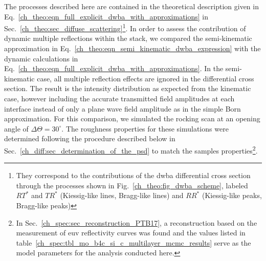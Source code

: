 The processes described here are contained in the theoretical description given in Eq.~\eqref{ch_theo:eqn_full_explicit_dwba_with_approximations} in Sec.~\ref{ch_theo:sec_diffuse_scattering}\footnote{They correspond to the contributions of the \gls{dwba} differential cross section through the processes shown in Fig.~\ref{ch_theo:fig_dwba_scheme}, labeled $R T^*$ and $T R^*$ (Kiessig-like lines, Bragg-like lines) and $R R^*$ (Kiessig-like peaks, Bragg-like peaks)}. In order to assess the contribution of dynamic multiple reflections within the stack, we compared the semi-kinematic approximation in Eq.~\eqref{ch_theo:eqn_semi_kinematic_dwba_expression} with the dynamic calculations in Eq.~\eqref{ch_theo:eqn_full_explicit_dwba_with_approximations}. In the semi-kinematic case, all multiple reflection effects are ignored in the differential cross section. The result is the intensity distribution as expected from the kinematic case, however including the accurate transmitted field amplitudes at each interface instead of only a plane wave field amplitude as in the simple Born approximation. For this comparison, we simulated the rocking scan at an opening angle of $\Delta \Theta = 30^\circ$. The roughness properties for these simulations were determined following the procedure described below in Sec.~\ref{ch_diff:sec_determination_of_the_psd} to match the samples properties\footnote{In Sec.~\ref{ch_spec:sec_reconstruction_PTB17}, a reconstruction based on the measurement of \gls{euv} reflectivity curves was found and the values listed in table~\ref{ch_spec:tbl_mo_b4c_si_c_multilayer_mcmc_results} serve as the model parameters for the analysis conducted here.}.

